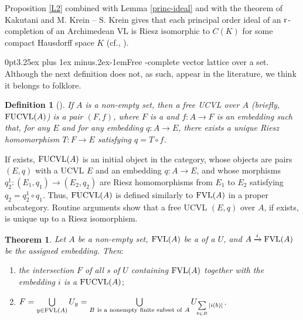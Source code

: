\documentclass[12pt]{article}
\makeatletter
\newtheorem{thm}{Theorem}
\newtheorem{defi}{Definition}
\renewcommand{\subsection}{\@startsection{subsection}{1}
{0pt}{3.25ex plus 1ex minus.2ex}{-1em}{\normalfont\normalsize\bf}}
\makeatother
\begin{document}
\smallskip
Proposition \ref{L2} combined with Lemma \ref{princ-ideal} and with the
theorem of Kakutani and M. Krein -- S. Krein gives that each principal order ideal
of an $\text{\rm r}$-completion of an Archimedean VL is Riesz isomorphic
to $C(K)$ for some compact Hausdorff space $K$ (cf., \cite[Theorem 2]{Veks1}).


\subsection{Free -complete vector lattice over a set.}
Although the next definition does not, as such, 
appear in the literature, we think it belongs to folklore.

\begin{defi}[]\label{d1}
If $A$ is a non-empty set, then a {\em free UCVL over} $A$ 
{\em (}briefly, $\text{\rm FUCVL}(A)${\em )} is 
a pair $(F,f)$, where $F$ is a  and $f:A\to F$ is an embedding 
such that, for any  $E$ and for any embedding $q:A\to E$, 
there exists a unique Riesz homomorphism $T:F\to E$ satisfying $q=T\circ f$. 
\end{defi}

If exists, $\text{\rm FUCVL}(A)$ is an initial object in 
the category, whose objects are pairs $(E,q)$ with a UCVL $E$ and an embedding $q :A\to E$, 
and whose morphisms $q_2^1:(E_1, q_1)\to(E_2, q_2)$ are Riesz homomorphisms 
from $E_1$ to $E_2$ satisfying $q_2=q_2^1\circ q_1$. 
Thus, $\text{\rm FUCVL}(A)$ is defined similarly to $\text{\rm FVL}(A)$ in a proper subcategory. 
Routine arguments show that a free UCVL $(E,q)$ over $A$, if exists,
is unique up to a Riesz isomorphism.

\begin{thm}\label{maintt1}
Let $A$ be a non-empty set, $\text{\rm FVL}(A)$ be a  
of a  $U$, and $A\xrightarrow[]{i}\text{\rm FVL}(A)$ be 
the assigned embedding. Then$:$
\begin{enumerate}[$(i)$]
\item
the intersection $F$ of all s of $U$ containing $\text{\rm FVL}(A)$  
together with the embedding $i$ is a $\text{\rm FUCVL}(A)$$;$
\item
$F=\bigcup\limits_{y\in\text{\rm FVL}(A)}U_y=
\bigcup\limits_{B\ \text{\rm is a nonempty finite 
subset of}\ A}U_{\sum\limits_{b\in B}|i(b)|}$.
\end{enumerate}
\end{thm}
\end{document}
